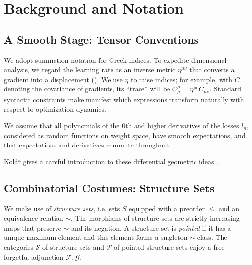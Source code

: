 \documentclass{article}
\newcommand{\Free}{\mathcal{F}}
\newcommand{\Forg}{\mathcal{G}}
\newcommand{\Ss}{\mathcal{S}}
\newcommand{\Pp}{\mathcal{P}}
\begin{document}
\section{Background and Notation}


    \subsection{A Smooth Stage: Tensor Conventions}
        We adopt summation notation for Greek indices.  To expedite dimensional
        analysis, we regard the learning rate as an inverse metric
        $\eta^{\mu\nu}$ that converts a gradient into a displacement
        (\cite{bo13}).  We use $\eta$ to raise indices; for example, with $C$
        denoting the covariance of gradients, its ``trace'' will be
        $C^{\mu}_{\mu} = \eta^{\mu\nu} C_{\mu\nu}$.  Standard syntactic
        constraints make manifest which expressions transform naturally with
        respect to optimization dynamics.
        
        We assume that all polynomials of the $0$th and higher derivatives of
        the losses $l_n$, considered as random functions on weight space, have
        smooth expectations, and that expectations and
        derivatives commute throughout.
        
        Kol\'{a}\u{r} gives a careful introduction to these differential
        geometric ideas .

    
    \subsection{Combinatorial Costumes: Structure Sets}
        We make use of \emph{structure sets}, i.e. sets $S$ equipped with a
        preorder $\leq$ and an equivalence relation $\sim$.  The morphisms of
        structure sets are strictly increasing maps that preserve $\sim$ and
        its negation.  A structure set is \emph{pointed} if it has a unique
        maximum element and this element forms a singleton $\sim$-class.  The
        categories $\Ss$ of structure sets and $\Pp$ of pointed structure sets
        enjoy a free-forgetful adjunction $\Free, \Forg$.
    
\end{document}
